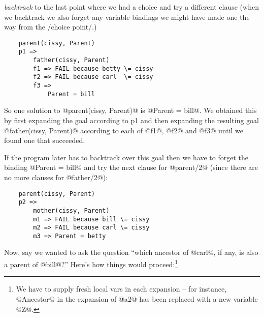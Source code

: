 \documentclass[a4paper,11pt,notitlepage,onecolumn]{article}
\begin{document}
\emph{backtrack} to the last point where we had a choice and try a
different clause (when we backtrack we also forget any
variable bindings we might have made one the way from the
/choice point/.)
\begin{verbatim}
    parent(cissy, Parent)
    p1 =>
        father(cissy, Parent)
        f1 => FAIL because betty \= cissy
        f2 => FAIL because carl  \= cissy
        f3 =>
            Parent = bill
\end{verbatim}
So one solution to @parent(cissy, Parent)@ is @Parent = bill@.  We
obtained this by first expanding the goal according to p1 and
then expanding the resulting goal @father(cissy, Parent)@
according to each of @f1@, @f2@ and @f3@ until we found one that
succeeded.

If the program later has to backtrack over this goal then we
have to forget the binding @Parent = bill@ and try the next
clause for @parent/2@ (since there are no more clauses for
@father/2@):
\begin{verbatim}
    parent(cissy, Parent)
    p2 =>
        mother(cissy, Parent)
        m1 => FAIL because bill \= cissy
        m2 => FAIL because carl \= cissy
        m3 => Parent = betty
\end{verbatim}
Now, say we wanted to ask the question ``which ancestor of
@carl@, if any, is also a parent of @bill@?''  Here's how things
would proceed:\footnote{We have to supply fresh local vars in each
 expansion -- for instance, @Ancestor@ in the expansion of @a2@ has
 been replaced with a new variable @Z@.}
\end{document}
